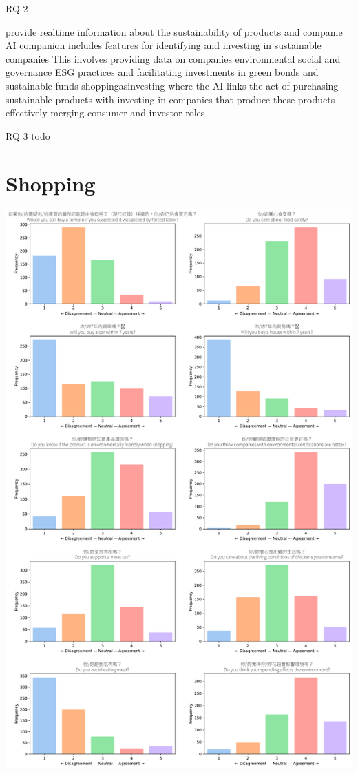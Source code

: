 \documentclass[
  letterpaper,
  DIV=11,
  numbers=noendperiod]{scrartcl}
\begin{document}
RQ 2

provide realtime information about the sustainability of products and
companie AI companion includes features for identifying and investing in
sustainable companies This involves providing data on companies
environmental social and governance ESG practices and facilitating
investments in green bonds and sustainable funds shoppingasinvesting
where the AI links the act of purchasing sustainable products with
investing in companies that produce these products effectively merging
consumer and investor roles

RQ 3 todo

\newpage

\section{Shopping}\label{shopping-1}

\includegraphics{_thesis_files/figure-pdf/cell-65-output-1.pdf}
\end{document}
